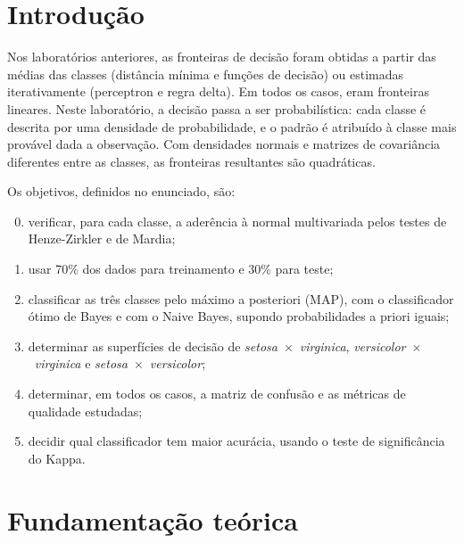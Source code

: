 \documentclass[12pt,a4paper]{article}
\newcommand{\setosa}{\emph{setosa}}
\newcommand{\versicolor}{\emph{versicolor}}
\newcommand{\virginica}{\emph{virginica}}
\begin{document}
\tableofcontents
\thispagestyle{empty}
\newpage

\section{Introdução}

Nos laboratórios anteriores, as fronteiras de decisão foram obtidas a partir das médias das classes (distância mínima e funções de decisão) ou estimadas iterativamente (perceptron e regra delta). Em todos os casos, eram fronteiras lineares. Neste laboratório, a decisão passa a ser probabilística: cada classe é descrita por uma densidade de probabilidade, e o padrão é atribuído à classe mais provável dada a observação. Com densidades normais e matrizes de covariância diferentes entre as classes, as fronteiras resultantes são quadráticas.

Os objetivos, definidos no enunciado, são:
\begin{enumerate}
  \setcounter{enumi}{-1}
  \item verificar, para cada classe, a aderência à normal multivariada pelos testes de Henze-Zirkler e de Mardia;
  \item[a)] usar 70\% dos dados para treinamento e 30\% para teste;
  \item[b)] classificar as três classes pelo máximo a posteriori (MAP), com o classificador ótimo de Bayes e com o Naive Bayes, supondo probabilidades a priori iguais;
  \item[c)] determinar as superfícies de decisão de \setosa{}~$\times$~\virginica{}, \versicolor{}~$\times$~\virginica{} e \setosa{}~$\times$~\versicolor{};
  \item[d)] determinar, em todos os casos, a matriz de confusão e as métricas de qualidade estudadas;
  \item[e)] decidir qual classificador tem maior acurácia, usando o teste de significância do Kappa.
\end{enumerate}

\section{Fundamentação teórica}\label{sec:teoria}
\end{document}
